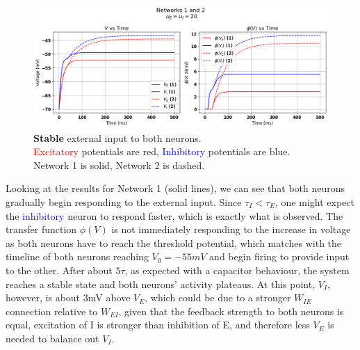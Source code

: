 \documentclass[10pt,twocolumn]{article}
\begin{document}
\begin{figure}
    \centering
    \captionsetup{justification=centering}
    \includegraphics[width=1\textwidth]{images/12-stable.png}
    \caption{
        \textbf{Stable} external input to both neurons.\\
        \textcolor{red}{Excitatory} potentials are red, \textcolor{blue}{Inhibitory} potentials are blue. \\
        Network 1 is solid, Network 2 is dashed.
    }
    \label{fig:stable-input}
\end{figure}

Looking at the results for Network 1 (solid lines), we can see that both neurons
gradually begin responding to the external input. Since $\tau_I < \tau_E$,
one might expect the \textcolor{blue}{inhibitory} neuron to respond faster, which is
exactly what is observed. The transfer function $\phi(V)$ is not immediately
responding to the increase in voltage as both neurons have to reach the threshold
potential, which matches with the timeline of both neurons reaching $V_0=-55mV$
and begin firing to provide input to the other. After about $5\tau$, as
expected with a capacitor behaviour, the system reaches a stable state
and both neurons' activity plateaus. At this point, $V_I$, however,
is about 3mV above $V_E$, which could be due to a stronger $W_{IE}$ connection
relative to $W_{EI}$, given that the feedback strength to both neurons is equal,
excitation of I is stronger than inhibition of E, and therefore less $V_E$
is needed to balance out $V_I$.
\end{document}
